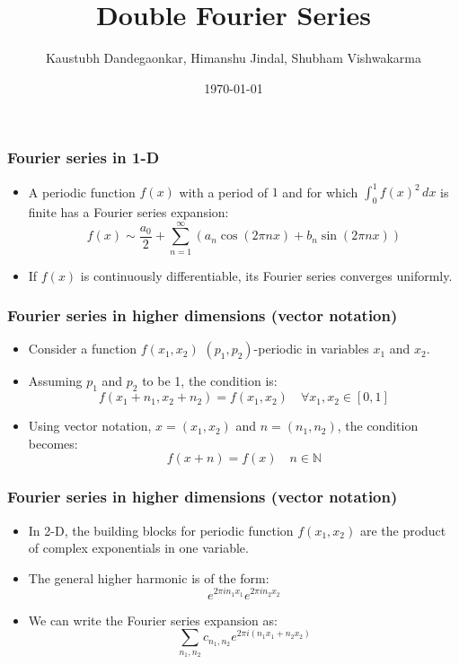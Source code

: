 \documentclass{beamer}
\title{Double Fourier Series}
\author{Kaustubh Dandegaonkar, Himanshu Jindal, Shubham Vishwakarma}
\date{\today}
\begin{document}
\frame{\titlepage}


\begin{frame}
\frametitle{Fourier series in 1-D}
\begin{itemize}
    \item A periodic function $f(x)$ with a period of $1$ and for which $\int_{0}^{1} f(x)^2 \,dx$ is finite has a Fourier series expansion:
    \[ f(x) \sim \frac{a_0}{2} + \sum_{n=1}^{\infty} \left( a_n \cos (2\pi nx) + b_n \sin(2\pi nx) \right) \]
    \item If $f(x)$ is continuously differentiable, its Fourier series converges uniformly.
\end{itemize}
\end{frame}


\begin{frame}
\frametitle{Fourier series in higher dimensions (vector notation)}
\begin{itemize}

    \item Consider a function $f(x_1, x_2)$ $(p_1, p_2)$-periodic in variables $x_1$ and $x_2$.
    \item Assuming $p_1$ and $p_2$ to be 1, the condition is:
    \[ f(x_1 + n_1, x_2 + n_2) = f(x_1, x_2) \quad \forall x_1, x_2 \in [0, 1] \]
    \item Using vector notation, $x = (x_1, x_2)$ and $n = (n_1, n_2)$, the condition becomes:
    \[ f(x+n) = f(x) \quad  n \in \mathbb{N} \]
\end{itemize}
\end{frame}

\begin{frame}
\frametitle{Fourier series in higher dimensions (vector notation)}
\begin{itemize}

    \item In 2-D, the building blocks for periodic function $f(x_1, x_2)$ are the product of complex exponentials in one variable.
    \item The general higher harmonic is of the form:
    \[ e^{2\pi in_1 x_1} e^{2\pi in_2 x_2} \]
    \item We can write the Fourier series expansion as:
    \[ \sum_{n_1, n_2} c_{n_1, n_2} e^{2\pi i (n_1 x_1 + n_2 x_2)} \]
\end{itemize}
\end{frame}
\end{document}
